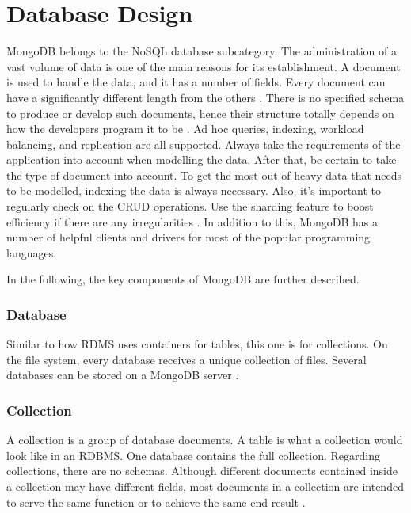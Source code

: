 \section{Database Design}

MongoDB belongs to the NoSQL database subcategory. The administration of a vast volume of data is one of the main reasons for its establishment. A document is used to handle the data, and it has a number of fields. Every document can have a significantly different length from the others \parencite{mungekar_2019}. There is no specified schema to produce or develop such documents, hence their structure totally depends on how the developers program it to be \parencite{taylor_2020}.
Ad hoc queries, indexing, workload balancing, and replication are all supported.
Always take the requirements of the application into account when modelling the data. After that, be certain to take the type of document into account. To get the most out of heavy data that needs to be modelled, indexing the data is always necessary. Also, it's important to regularly check on the CRUD operations. Use the sharding feature to boost efficiency if there are any irregularities \parencite{taylor_2020, mungekar_2019}.
In addition to this, MongoDB has a number of helpful clients and drivers for most of the popular programming languages.

In the following, the key components of MongoDB are further described.

\subsubsection{Database}

Similar to how RDMS uses containers for tables, this one is for collections. On the file system, every database receives a unique collection of files. Several databases can be stored on a MongoDB server \parencite{taylor_2020}.

\subsubsection{Collection}

A collection is a group of database documents. A table is what a collection would look like in an \ac{RDBMS}. One database contains the full collection. Regarding collections, there are no schemas. Although different documents contained inside a collection may have different fields, most documents in a collection are intended to serve the same function or to achieve the same end result \parencite{intellipaat_2016}.

